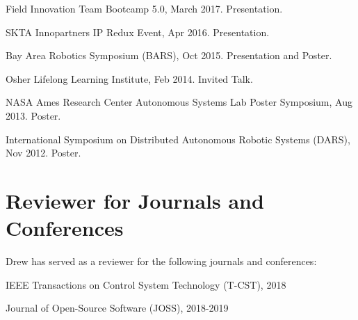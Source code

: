 \documentclass[letterpaper]{deedy-resume} %
\begin{document}
{\begin{etaremune}
\item {} Field Innovation Team Bootcamp 5.0, March 2017. Presentation.

\item {} SKTA Innopartners IP Redux Event, Apr 2016. Presentation.

\item {} Bay Area Robotics Symposium (BARS), Oct 2015. Presentation and Poster.
  
\item {\Large{\textasteriskcentered}} {} Osher Lifelong Learning Institute, Feb 2014. Invited Talk.

\item {} NASA Ames Research Center Autonomous Systems Lab Poster Symposium, Aug 2013. Poster.

\item {} International Symposium on Distributed Autonomous Robotic Systems (DARS), Nov 2012. Poster.

\end{etaremune}



\section{Reviewer for Journals and Conferences}

\vspace{0.2cm}

Drew has served as a reviewer for the following journals and conferences:

\vspace{0.2cm}

\begin{tightitemize}

\item IEEE Transactions on Control System Technology (T-CST), 2018

\item Journal of Open-Source Software (JOSS), 2018-2019
  

\end{tightitemize}}
\end{document}
